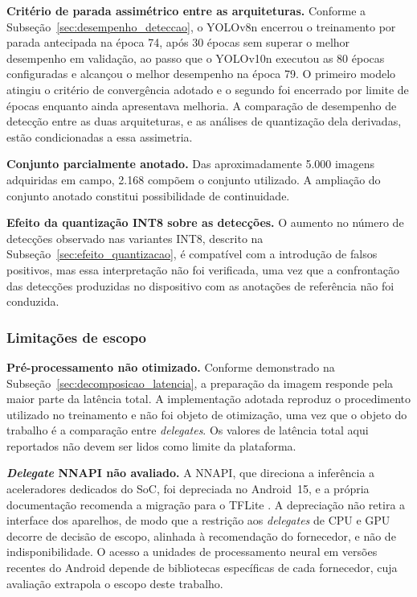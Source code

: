 \documentclass[artigo,times,capa]{iftex2024}
\begin{document}
\textbf{Critério de parada assimétrico entre as arquiteturas.} Conforme a Subseção~\ref{sec:desempenho_deteccao}, o YOLOv8n encerrou o treinamento por parada antecipada na época 74, após 30 épocas sem superar o melhor desempenho em validação, ao passo que o YOLOv10n executou as 80 épocas configuradas e alcançou o melhor desempenho na época 79. O primeiro modelo atingiu o critério de convergência adotado e o segundo foi encerrado por limite de épocas enquanto ainda apresentava melhoria. A comparação de desempenho de detecção entre as duas arquiteturas, e as análises de quantização dela derivadas, estão condicionadas a essa assimetria.

\textbf{Conjunto parcialmente anotado.} Das aproximadamente 5.000 imagens adquiridas em campo, 2.168 compõem o conjunto utilizado. A ampliação do conjunto anotado constitui possibilidade de continuidade.

\textbf{Efeito da quantização \ac{INT8} sobre as detecções.} O aumento no número de detecções observado nas variantes \ac{INT8}, descrito na Subseção~\ref{sec:efeito_quantizacao}, é compatível com a introdução de falsos positivos, mas essa interpretação não foi verificada, uma vez que a confrontação das detecções produzidas no dispositivo com as anotações de referência não foi conduzida.

\subsubsection{Limitações de escopo}

\textbf{Pré-processamento não otimizado.} Conforme demonstrado na Subseção~\ref{sec:decomposicao_latencia}, a preparação da imagem responde pela maior parte da latência total. A implementação adotada reproduz o procedimento utilizado no treinamento e não foi objeto de otimização, uma vez que o objeto do trabalho é a comparação entre \textit{delegates}. Os valores de latência total aqui reportados não devem ser lidos como limite da plataforma.

\textbf{\textit{Delegate} NNAPI não avaliado.} A \ac{NNAPI}, que direciona a inferência a aceleradores dedicados do \ac{SoC}, foi depreciada no Android~15, e a própria documentação recomenda a migração para o \ac{TFLite} \cite{Android2026NNAPI}. A depreciação não retira a interface dos aparelhos, de modo que a restrição aos \textit{delegates} de \ac{CPU} e \ac{GPU} decorre de decisão de escopo, alinhada à recomendação do fornecedor, e não de indisponibilidade. O acesso a unidades de processamento neural em versões recentes do Android depende de bibliotecas específicas de cada fornecedor, cuja avaliação extrapola o escopo deste trabalho.
\end{document}
